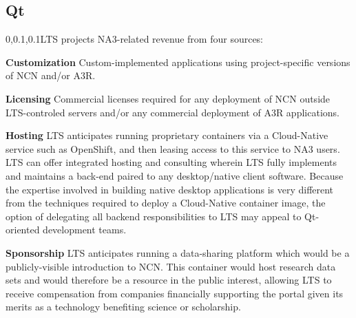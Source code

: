 
\begin{frame}{}
\section{Qt}
\vspace{.5em}	

{\Large{}\selectfont
\hspace*{-20pt}\begin{minipage}{1.08\textwidth}
\vspace{4pt}


		
\begin{lightquadblockc}{0,0.1,0.1}{LTS projects NA3-related 
		revenue from four sources:}
\begin{center}\begin{minipage}{\textwidth}
{\LARGE \setlength{\leftmargini}{30pt}\begin{enumerate}
\dmitem \textbf{Customization} \hspace{.5em} Custom-implemented applications 
using project-specific versions of NCN and/or A3R.

\dmitem \textbf{Licensing}  \hspace{.5em} Commercial licenses required for 
any deployment of NCN outside LTS-controled 
servers and/or any commercial deployment of A3R 
applications.

\dmitem \textbf{Hosting}  \hspace{.5em} LTS anticipates running proprietary 
containers via a Cloud-Native service such as 
OpenShift, and then leasing access to this service 
to NA3 users.  LTS can offer integrated hosting and consulting 
wherein LTS fully implements and maintains a back-end 
paired to any desktop/native client software.
Because the expertise involved 
in building native desktop applications is very different 
from the techniques required to deploy a Cloud-Native container 
image, the option of delegating all 
backend responsibilities to LTS may 
appeal to Qt-oriented development teams.

\dmitem \textbf{Sponsorship}  \hspace{.5em} LTS anticipates 
running a data-sharing platform which would be a 
publicly-visible introduction to NCN.  
This  container 
would host research data sets and 
would therefore be a resource in the public 
interest, allowing LTS to receive compensation 
from companies financially supporting the 
portal given its merits as a technology 
benefiting science or scholarship.
\end{enumerate}
}\end{minipage}
\end{center}
\end{lightquadblockc}
\end{minipage}

}

\end{frame}

